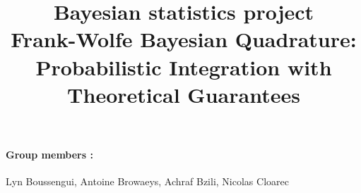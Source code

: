 \documentclass[a4paper,twocolumn,10pt]{article}
\title{\textbf{Bayesian statistics project} \\ Frank-Wolfe Bayesian Quadrature: Probabilistic Integration with Theoretical Guarantees}
\author{}
\date{}
\begin{document}
\maketitle

\paragraph{Group members : }
Lyn​ Boussengui, Antoine Browaeys, Achraf Bzili, Nicolas Cloarec




\nocite{*}


\end{document}
